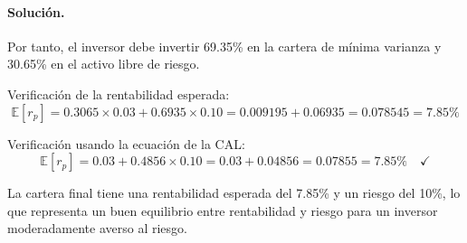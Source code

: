 \documentclass[12pt,a4paper]{article}
\newcommand{\E}{\mathbb{E}}
\newenvironment{solucion}{\paragraph{Solución.}}{}
\begin{document}
\begin{solucion}
\begin{enumerate}[label=\alph*)]
  Por tanto, el inversor debe invertir 69.35\% en la cartera de mínima varianza y 30.65\% en el activo libre de riesgo.
  
  Verificación de la rentabilidad esperada:
  \[
  \E[r_p] = 0.3065 \times 0.03 + 0.6935 \times 0.10 = 0.009195 + 0.06935 = 0.078545 = 7.85\%
  \]
  
  Verificación usando la ecuación de la CAL:
  \[
  \E[r_p] = 0.03 + 0.4856 \times 0.10 = 0.03 + 0.04856 = 0.07855 = 7.85\% \quad \checkmark
  \]
  
  La cartera final tiene una rentabilidad esperada del 7.85\% y un riesgo del 10\%, lo que representa un buen equilibrio entre rentabilidad y riesgo para un inversor moderadamente averso al riesgo.
\end{enumerate}
\end{solucion}
\end{document}
